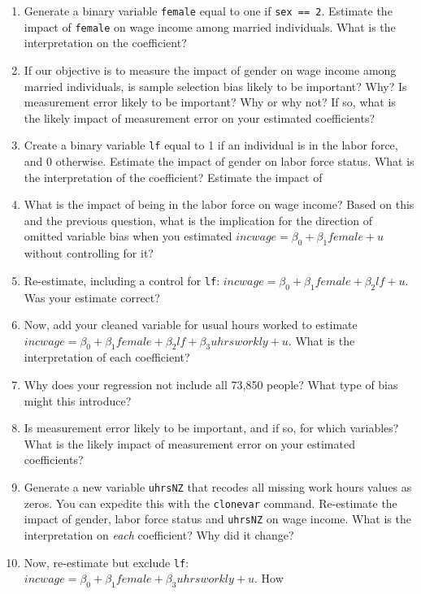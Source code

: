 \documentclass[11pt]{article}
\begin{document}
\begin{enumerate}
\def\labelenumi{\arabic{enumi}.}
\setcounter{enumi}{3}
\item
  Generate a binary variable \texttt{female} equal to one if
  \texttt{sex\ ==\ 2}. Estimate the impact of \texttt{female} on wage
  income among married individuals. What is the interpretation on the
  coefficient?
\item
  If our objective is to measure the impact of gender on wage income
  among married individuals, is sample selection bias likely to be
  important? Why?  Is measurement error likely to be important? Why or why not?  If so, what is the likely impact of measurement error on your
  estimated coefficients?
\item
  Create a binary variable \texttt{lf} equal to 1 if an individual is in
  the labor force, and 0 otherwise. Estimate the impact of gender on
  labor force status. What is the interpretation of the coefficient?
  Estimate the impact of
\item
  What is the impact of being in the labor force on wage income? Based
  on this and the previous question, what is the implication for the
  direction of omitted variable bias when you estimated
  \(incwage = \beta_0 + \beta_1 female + u\) without controlling for
  it?
\item
  Re-estimate, including a control for \texttt{lf}:
  \(incwage = \beta_0 + \beta_1 female + \beta_2 lf + u\). Was your
  estimate correct?
\item
  Now, add your cleaned variable for usual hours worked to estimate
  \(incwage = \beta_0 + \beta_1 female + \beta_2 lf + \beta_3 uhrsworkly + u\).
  What is the interpretation of each coefficient?
\item
  Why does your regression not include all 73,850 people? What type of
  bias might this introduce?
\item
  Is measurement error likely to be important, and if so, for which
  variables? What is the likely impact of measurement error on your
  estimated coefficients?
\item
  Generate a new variable \texttt{uhrsNZ} that recodes all missing work
  hours values as zeros. You can expedite this with the
  \texttt{clonevar} command. Re-estimate the impact of gender, labor
  force status and \texttt{uhrsNZ} on wage income. What is the
  interpretation on \emph{each} coefficient? Why did it change?
\item
  Now, re-estimate but exclude \texttt{lf}:
  \(incwage = \beta_0 + \beta_1 female + \beta_3 uhrsworkly + u\). How

\end{enumerate}
\end{document}
